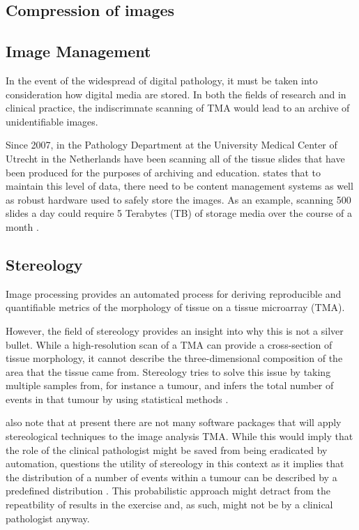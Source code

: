 \documentclass[12pt]{article}
\begin{document}
\subsection{Compression of images}


\subsection{Image Management}
In the event of the widespread of digital pathology, it must be taken into consideration how digital media are stored. 
In both the fields of research and in clinical practice, the indiscrimnate scanning of TMA would lead to an archive 
of unidentifiable images.

Since 2007, \parencite{stathonikos2013going} in the Pathology Department at the University Medical Center of Utrecht 
in the Netherlands have been scanning all of the tissue slides that have been produced for the purposes of archiving 
and education. \parencite{hamilton2014digital} states that to maintain this level of data, there need to be content 
management systems as well as robust hardware used to safely store the images. As an example, scanning 500 slides 
a day could require 5 Terabytes (TB) of storage media over the course of a month \parencite{hamilton2014digital}.



\subsection{Stereology}
Image processing provides an automated process for deriving reproducible and quantifiable metrics of the 
morphology of tissue on a tissue microarray (TMA).

However, the field of stereology provides an insight into why this is not a silver bullet. While a high-resolution 
scan of a TMA can provide a cross-section of tissue morphology, it cannot describe the three-dimensional 
composition of the area that the tissue came from. Stereology tries to solve this issue by taking multiple samples 
from, for instance a tumour, and infers the total number of events in that tumour by using statistical methods 
\parencite{webster2014whole}.

\citeauthor{webster2014whole} also note that at present there are not many software packages that will apply 
stereological techniques to the image analysis TMA. While this would imply that the role of the clinical pathologist 
might be saved from being eradicated by automation, \citeauthor{suvarna2013bancroft} questions the utility of 
stereology in this context as it implies that the distribution of a number of events within a tumour can be described 
by a predefined distribution \parencite[p.~540, Ch.~23.]{suvarna2013bancroft}. This probabilistic approach might 
detract from the repeatbility of results in the exercise and, as such, might not be by a clinical pathologist anyway.
\end{document}

